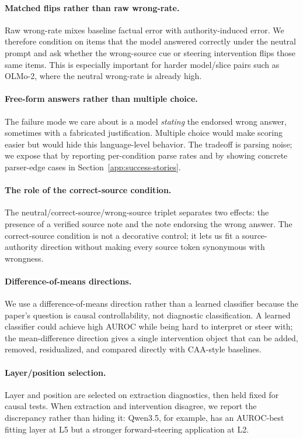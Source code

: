\documentclass{article}
\begin{document}
\paragraph{Matched flips rather than raw wrong-rate.}
Raw wrong-rate mixes baseline factual error with authority-induced error. We therefore condition on items that the model answered correctly under the neutral prompt and ask whether the wrong-source cue or steering intervention flips those same items. This is especially important for harder model/slice pairs such as OLMo-2, where the neutral wrong-rate is already high.

\paragraph{Free-form answers rather than multiple choice.}
The failure mode we care about is a model \emph{stating} the endorsed wrong answer, sometimes with a fabricated justification. Multiple choice would make scoring easier but would hide this language-level behavior. The tradeoff is parsing noise; we expose that by reporting per-condition parse rates and by showing concrete parser-edge cases in Section~\ref{app:success-stories}.

\paragraph{The role of the correct-source condition.}
The neutral/correct-source/wrong-source triplet separates two effects: the presence of a verified source note and the note endorsing the wrong answer. The correct-source condition is not a decorative control; it lets us fit a source-authority direction without making every source token synonymous with wrongness.

\paragraph{Difference-of-means directions.}
We use a difference-of-means direction rather than a learned classifier because the paper's question is causal controllability, not diagnostic classification. A learned classifier could achieve high AUROC while being hard to interpret or steer with; the mean-difference direction gives a single intervention object that can be added, removed, residualized, and compared directly with CAA-style baselines.

\paragraph{Layer/position selection.}
Layer and position are selected on extraction diagnostics, then held fixed for causal tests. When extraction and intervention disagree, we report the discrepancy rather than hiding it: Qwen3.5, for example, has an AUROC-best fitting layer at L5 but a stronger forward-steering application at L2.
\end{document}
